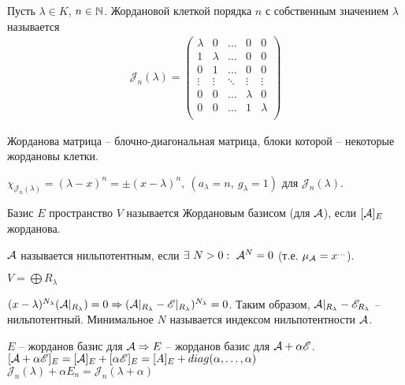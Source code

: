 \documentclass[main]{subfiles}
\begin{document}
\begin{definition} 
  Пусть  $\lambda \in K$, $n \in \mathbb{N}$. Жордановой клеткой порядка $n$ с собственным значением $\lambda$ называется
  \begin{gather*} \mathcal{J}_n(\lambda) =
    \begin{pmatrix}
      \lambda & 0       & \ldots & 0       & 0       \\
      1       & \lambda & \ldots & 0       & 0       \\
      0       & 1       & \ldots & 0       & 0       \\
      \vdots  & \vdots  & \ddots & \vdots  & \vdots  \\
      0       & 0       & \ldots & \lambda & 0       \\
      0       & 0       & \ldots & 1       & \lambda \\
    \end{pmatrix}
  \end{gather*}

  Жорданова матрица -- блочно-диагональная матрица, блоки которой -- некоторые жордановы клетки.

  $\chi_{\mathcal{J}_n(\lambda)} = (\lambda - x)^n = \pm (x - \lambda)^n, \ (a_{\lambda} = n,\ g_{\lambda} = 1)$ для $\mathcal{J}_n(\lambda)$.

  Базис $E$ пространство $V$ называется Жордановым базисом (для $\mathcal{A}$), если $[\mathcal{A}]_E$ жорданова.
\end{definition}

\begin{definition} 
  $\mathcal{A}$ называется нильпотентным, если $\exists \ N > 0: \ \mathcal{A}^N = 0$ (т.е. $\mu_{\mathcal{A}} = x^{...}$).
\end{definition}

$V = \bigoplus R_{\lambda}$

$(x - \lambda)^{N_{\lambda}}(\mathcal{A} |_{R_{\lambda}}) = 0 \Rightarrow (\mathcal{A} |_{R_{\lambda}} - \mathscr{E} |_{R_{\lambda}})^{N_{\lambda}} = 0$.
Таким образом, $\mathcal{A} |_{R_{\lambda}} - \mathscr{E}_{R_{\lambda}}$ -- нильпотентный. Минимальное $N$ называется индексом нильпотентности $\mathcal{A}$.

\begin{remark}
  $E$ -- жорданов базис для $\mathcal{A} \Rightarrow E$ -- жорданов базис для $\mathcal{A} + \alpha \mathscr{E}$.
  $[\mathcal{A} + \alpha \mathscr{E}]_E = [\mathcal{A}]_E + [\alpha \mathscr{E}]_E = [A]_E + diag(\alpha, \ldots, \alpha)$
  $\mathcal{J}_n(\lambda) + \alpha E_n = \mathcal{J}_n(\lambda + \alpha)$
\end{remark}
\end{document}
